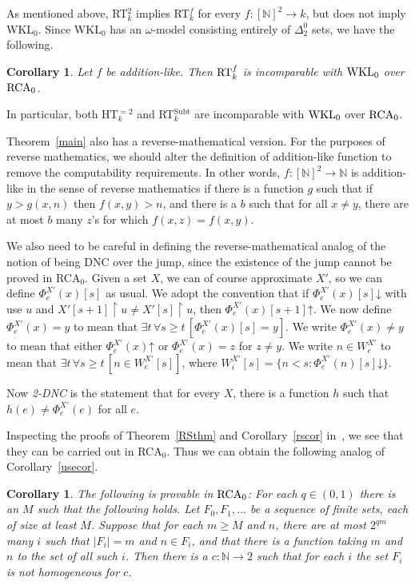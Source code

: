 \documentclass{amsart}
\newtheorem{cor}[thm]{Corollary}
\theoremstyle{definition}
\renewcommand{\geq}{\geqslant}
\newcommand{\converges}{\mathord{\downarrow}}
\newcommand{\diverges}{\mathord{\uparrow}}
\newcommand{\uhr}{\upharpoonright}
\DeclareMathOperator{\subt}{Subt}
\begin{document}
As mentioned above, RT$^2_k$ implies RT$^f_k$ for every $f : [\mathbb
N]^2 \rightarrow k$, but does not imply WKL$_0$. Since WKL$_0$ has an
$\omega$-model consisting entirely of $\Delta^0_2$ sets, we have the
following.

\begin{cor}
Let $f$ be addition-like. Then $\textup{RT}^f_k$ is incomparable with
$\textup{WKL}_0$ over $\textup{RCA}_0$.
\end{cor}

In particular, both HT$^{=2}_k$ and RT$^{\subt}_k$ are incomparable with
$\textup{WKL}_0$ over $\textup{RCA}_0$.

Theorem~\ref{main} also has a reverse-mathematical version. For the
purposes of reverse mathematics, we should alter the definition of
addition-like function to remove the computability requirements. In
other words, $f : [\mathbb N]^2 \rightarrow \mathbb N$ is
addition-like in the sense of reverse mathematics if there is a
function $g$ such that if $y>g(x,n)$ then $f(x,y)>n$, and there is a
$b$ such that for all $x \neq y$, there are at most $b$ many $z$'s for
which $f(x,z)=f(x,y)$.

We also need to be careful in defining the reverse-mathematical analog
of the notion of being DNC over the jump, since the existence of the
jump cannot be proved in RCA$_0$. Given a set $X$, we can of course
approximate $X'$, so we can define $\Phi_e^{X'}(x)[s]$ as
usual. We adopt the convention that if $\Phi_e^{X'}(x)[s]\converges$
with use $u$ and $X'[s+1] \uhr u \neq X'[s] \uhr u$, then
$\Phi_e^{X'}(x)[s+1]\diverges$. We now define $\Phi_e^{X'}(x)=y$ to mean
that $\exists t\, \forall s \geq t\, [\Phi_e^{X'}(x)[s]=y]$. We write
$\Phi_e^{X'}(x) \neq y$ to mean that either $\Phi_e^{X'}(x)\diverges$
or $\Phi_e^{X'}(x)=z$ for $z \neq y$. We write $n \in W_e^{X'}$ to
mean that $\exists t\, \forall s \geq t \, [n \in W_e^{X'}[s]]$, where
$W_i^{X'}[s] = \{n<s : \Phi_e^{X'}(n)[s]\converges\}$.

Now \emph{2-DNC} is the statement that for every $X$, there is a
function $h$ such that $h(e) \neq \Phi_e^{X'}(e)$ for all $e$.

Inspecting the proofs of Theorem~\ref{RSthm} and Corollary~\ref{rscor}
in~\cite{RS}, we see that they can be carried out in RCA$_0$. Thus we
can obtain the following analog of Corollary~\ref{usecor}.

\begin{cor}
The following is provable in $\textup{RCA}_0$: For each $q \in (0,1)$
there is an $M$ such that the following holds. Let $F_0,F_1,\ldots$ be
a sequence of finite sets, each of size at least $M$. Suppose that for
each $m \geq M$ and $n$, there are at most $2^{qm}$ many $i$ such that
$|F_i|=m$ and $n \in F_i$, and that there is a function taking $m$ and
$n$ to the set of all such $i$. Then there is a $c : \mathbb N
\rightarrow 2$ such that for each $i$ the set $F_i$ is not homogeneous
for $c$.
\end{cor}
\end{document}
